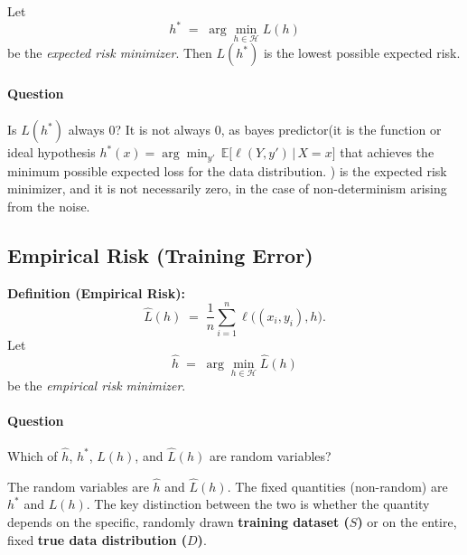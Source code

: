 \documentclass[11pt]{article}
\theoremstyle{plain} %
\begin{document}
\medskip
\noindent Let
\[
  h^*
  \;=\;
  \arg\min_{h\in\mathcal{H}}L(h)
\]
be the \emph{expected risk minimizer}.  Then $L(h^*)$ is the lowest possible expected risk.

\paragraph{Question}
Is $L(h^*)$ always $0$?
It is not always 0, as bayes predictor(it is the function or ideal hypothesis $h^*(x) = \arg\min_{y'} \, \mathbb{E}\big[ \ell(Y, y') \,\big|\, X = x \big]$ that achieves the minimum possible expected loss for the data distribution.
) is the expected risk minimizer, and it is not necessarily zero, in the case of non-determinism arising from the noise.

\subsection{Empirical Risk (Training Error)}
\noindent\textbf{Definition (Empirical Risk):}
\[
  \widehat{L}(h)
  \;=\;
  \frac{1}{n}
  \sum_{i=1}^{n}
  \ell\bigl((x_i,y_i),h\bigr).
\]
\noindent Let
\[
  \widehat{h}
  \;=\;
  \arg\min_{h\in\mathcal{H}}\widehat{L}(h)
\]
be the \emph{empirical risk minimizer}.

\paragraph{Question}
Which of $\hat{h}$, $h^*$, $L(h)$, and $\hat{L}(h)$ are random variables?
\medskip

\noindent The random variables are $\hat{h}$ and $\hat{L}(h)$. The fixed quantities (non-random) are $h^*$ and $L(h)$.
The key distinction between the two is whether the quantity depends on the specific, randomly drawn \textbf{training dataset ($S$)} or on the entire, fixed \textbf{true data distribution ($D$)}.
\end{document}
